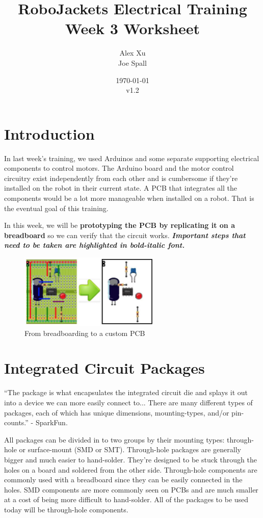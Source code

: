 \documentclass{article}
\title{RoboJackets Electrical Training Week 3 Worksheet}
\author{Alex Xu \\ Joe Spall}
\date{\today\\v1.2}
\begin{document}
\maketitle{}
\setcounter{tocdepth}{2}
\tableofcontents
\pagebreak

\section{Introduction}
In last week's training, we used Arduinos and some separate supporting electrical components to control motors. The Arduino board and the motor control circuitry exist independently from each other and is cumbersome if they're installed on the robot in their current state. A PCB that integrates all the components would be a lot more manageable when installed on a robot. That is the eventual goal of this training. \par
In this week, we will be \textbf{prototyping the PCB by replicating it on a breadboard} so we can verify that the circuit works. \textbf{\emph{Important steps that need to be taken are highlighted in bold-italic font.}}

\begin{figure}[!h]
    \center
    \includegraphics[width=0.6\textwidth,height=0.6\textheight,keepaspectratio]{breadboard_to_pcb}
    \caption {From breadboarding to a custom PCB}
\end{figure}

\section{Integrated Circuit Packages}
``The package is what encapsulates the integrated circuit die and splays it out into a device we can more easily connect to... There are many different types of packages, each of which has unique dimensions, mounting-types, and/or pin-counts.''  - SparkFun. \par
All packages can be divided in to two groups by their mounting types: through-hole or surface-mount (SMD or SMT). Through-hole packages are generally bigger and much easier to hand-solder. They're designed to be stuck through the holes on a board and soldered from the other side. Through-hole components are commonly used with a breadboard since they can be easily connected in the holes. SMD components are more commonly seen on PCBs and are much smaller at a cost of being more difficult to hand-solder. All of the packages to be used today will be through-hole components.
\end{document}
